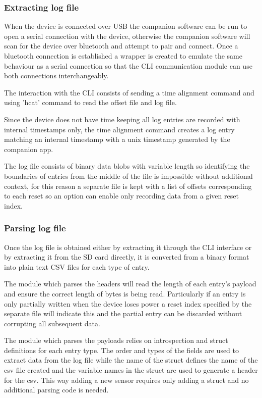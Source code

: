 \subsubsection{Extracting log file}

When the device is connected over USB the companion software can be run to open a serial connection with the device, otherwise the companion software will scan for the device over bluetooth and attempt to pair and connect.  Once a bluetooth connection is established a wrapper is created to emulate the same behaviour as a serial connection so that the CLI communication module can use both connections interchangeably.

The interaction with the CLI consists of sending a time alignment command and using 'hcat' command to read the offset file and log file.  

Since the device does not have time keeping all log entries are recorded with internal timestamps only, the time alignment command creates a log entry matching an internal timestamp with a unix timestamp generated by the companion app.  

The log file consists of binary data blobs with variable length so identifying the boundaries of entries from the middle of the file is impossible without additional context, for this reason a separate file is kept with a list of offsets corresponding to each reset so an option can enable only recording data from a given reset index.

\subsubsection{Parsing log file}

Once the log file is obtained either by extracting it through the CLI interface or by extracting it from the SD card directly, it is converted from a binary format into plain text CSV files for each type of entry.

The module which parses the headers will read the length of each entry's payload and ensure the correct length of bytes is being read.  Particularly if an entry is only partially written when the device loses power a reset index specified by the separate file will indicate this and the partial entry can be discarded without corrupting all subsequent data.

The module which parses the payloads relies on introspection and struct definitions for each entry type.  The order and types of the fields are used to extract data from the log file while the name of the struct defines the name of the csv file created and the variable names in the struct are used to generate a header for the csv.  This way adding a new sensor requires only adding a struct and no additional parsing code is needed.


